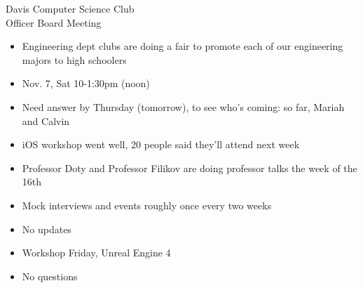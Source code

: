 \documentclass{article}
\begin{document}
\begin{Minutes}{Davis Computer Science Club\\Officer Board Meeting}
\begin {itemize}
    \item Engineering dept clubs are doing a fair to promote each of our engineering majors to high schoolers
	\item Nov. 7, Sat 10-1:30pm (noon)
	\item Need answer by Thursday (tomorrow), to see who's coming: so far, Mariah and Calvin 
\end {itemize}


\begin {itemize} 
    \item iOS workshop went well, 20 people said they'll attend next week
\end {itemize}

\begin {itemize}
    \item Professor Doty and Professor Filikov are doing professor talks the week of the 16th
	\item Mock interviews and events roughly once every two weeks
\end {itemize}

\begin{itemize}
    \item No updates
\end {itemize}

\begin {itemize}
    \item Workshop Friday, Unreal Engine 4
\end {itemize}

\begin {itemize}
    \item No questions
\end {itemize}

\end{Minutes}
\thispagestyle{creditfooter}
\end{document}
